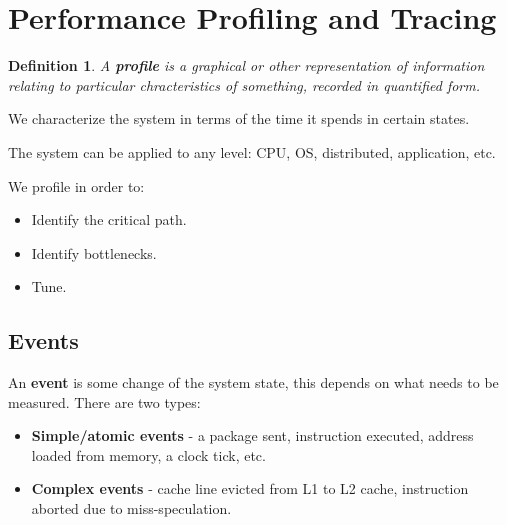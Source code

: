 \documentclass[11pt]{article}
\newtheorem{defn}{Definition}
\begin{document}
\section{Performance Profiling and Tracing}
\begin{defn}
  A \textbf{profile} is a graphical or other representation of information relating to particular chracteristics of something, recorded in quantified form.
\end{defn}
We characterize the system in terms of the time it spends in certain states.

The system can be applied to any level: CPU, OS, distributed, application, etc.

We profile in order to:
\begin{itemize}
  \item Identify the critical path.
  \item Identify bottlenecks.
  \item Tune.
\end{itemize}

\subsection{Events}
An \textbf{event} is some change of the system state, this depends on what needs to be measured.
There are two types:
\begin{itemize}
  \item \textbf{Simple/atomic events} - a package sent, instruction executed, address loaded from memory, a clock tick, etc.
  \item \textbf{Complex events} - cache line evicted from L1 to L2 cache, instruction aborted due to miss-speculation.
\end{itemize}
\end{document}
